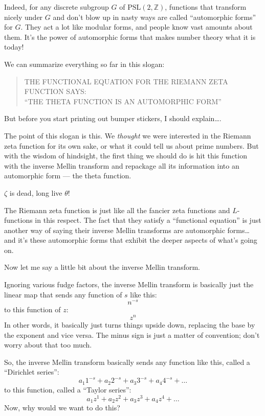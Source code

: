 \documentclass{article}
\begin{document}
Indeed, for any discrete subgroup \(G\) of
\(\mathrm{PSL}(2,\mathbb{Z})\), functions that transform nicely under
\(G\) and don't blow up in nasty ways are called ``automorphic forms''
for \(G\). They act a lot like modular forms, and people know vast
amounts about them. It's the power of automorphic forms that makes
number theory what it is today!

We can summarize everything so far in this slogan:

\begin{quote}
THE FUNCTIONAL EQUATION FOR THE RIEMANN ZETA FUNCTION SAYS:\\
``THE THETA FUNCTION IS AN AUTOMORPHIC FORM''
\end{quote}

But before you start printing out bumper stickers, I should
explain\ldots.

The point of this slogan is this. We \emph{thought} we were interested
in the Riemann zeta function for its own sake, or what it could tell us
about prime numbers. But with the wisdom of hindsight, the first thing
we should do is hit this function with the inverse Mellin transform and
repackage all its information into an automorphic form --- the theta
function.

\(\zeta\) is dead, long live \(\theta\)!

The Riemann zeta function is just like all the fancier zeta functions
and \(L\)-functions in this respect. The fact that they satisfy a
``functional equation'' is just another way of saying their inverse
Mellin transforms are automorphic forms\ldots{} and it's these
automorphic forms that exhibit the deeper aspects of what's going on.

Now let me say a little bit about the inverse Mellin transform.

Ignoring various fudge factors, the inverse Mellin transform is
basically just the linear map that sends any function of \(s\) like
this: \[n^{-s}\] to this function of \(z\): \[z^n\] In other words, it
basically just turns things upside down, replacing the base by the
exponent and vice versa. The minus sign is just a matter of convention;
don't worry about that too much.

So, the inverse Mellin transform basically sends any function like this,
called a ``Dirichlet series'':
\[a_1 1^{-s} + a_2 2^{-s} + a_3 3^{-s} + a_4 4^{-s} + \ldots\] to this
function, called a ``Taylor series'':
\[a_1 z^1 + a_2 z^2 + a_3 z^3 + a_4 z^4 + \ldots\] Now, why would we
want to do this?
\end{document}
